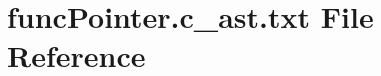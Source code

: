 \hypertarget{funcPointer_8c__ast_8txt}{}\section{func\+Pointer.\+c\+\_\+ast.\+txt File Reference}
\label{funcPointer_8c__ast_8txt}
